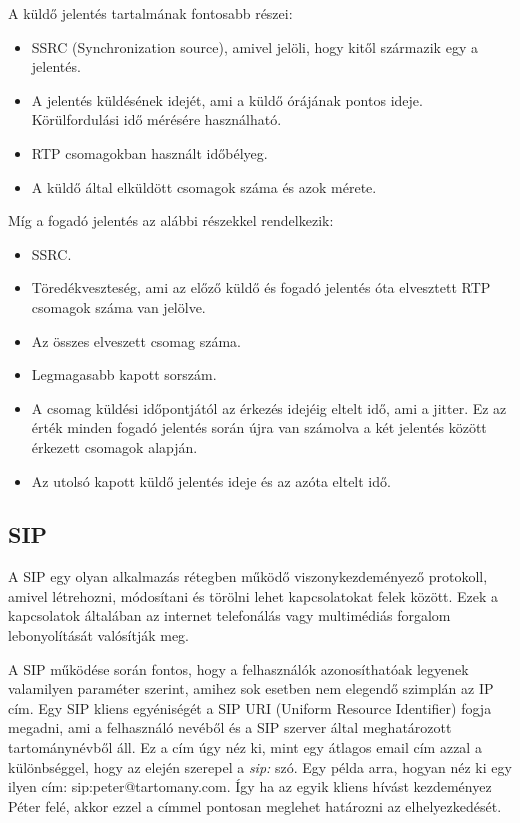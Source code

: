 A küldő jelentés tartalmának fontosabb részei:

\begin{itemize}
	\item SSRC (Synchronization source), amivel jelöli, hogy kitől származik egy a jelentés.
	\item A jelentés küldésének idejét, ami a küldő órájának pontos ideje. Körülfordulási
	idő mérésére használható. 
	\item RTP csomagokban használt időbélyeg. 
	\item A küldő által elküldött csomagok száma és azok mérete.
\end{itemize}

Míg a fogadó jelentés az alábbi részekkel rendelkezik:

\begin{itemize}
	\item SSRC.
	\item Töredékveszteség, ami az előző küldő és fogadó jelentés óta elvesztett RTP csomagok
	száma van jelölve.
	\item Az összes elveszett csomag száma. 
	\item Legmagasabb kapott sorszám. 
	\item A csomag küldési időpontjától az érkezés idejéig eltelt idő, ami a jitter. Ez az érték
	minden fogadó jelentés során újra van számolva a két jelentés között érkezett csomagok 
	alapján.
	\item Az utolsó kapott küldő jelentés ideje és az azóta eltelt idő.  
\end{itemize}

\subsection{SIP}

A SIP egy olyan alkalmazás rétegben működő viszonykezdeményező protokoll, amivel 
létrehozni, módosítani és törölni lehet kapcsolatokat felek között. Ezek a kapcsolatok 
általában az internet telefonálás vagy multimédiás forgalom lebonyolítását valósítják meg. 

A SIP működése során fontos, hogy a felhasználók azonosíthatóak legyenek valamilyen
paraméter szerint, amihez sok esetben nem elegendő szimplán az IP cím. Egy 
SIP kliens egyéniségét a SIP URI (Uniform Resource Identifier) fogja megadni, ami
a  felhasználó nevéből és a SIP szerver által meghatározott tartománynévből áll.
Ez a cím úgy néz ki, mint egy átlagos email cím azzal a különbséggel, hogy az 
elején szerepel a \textit{sip:} szó. Egy példa arra, hogyan néz ki egy ilyen cím: 
sip:peter@tartomany.com. Így ha az egyik kliens hívást kezdeményez Péter felé,
akkor ezzel a címmel pontosan meglehet határozni az elhelyezkedését. 

